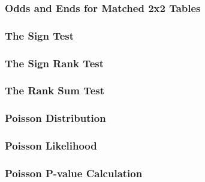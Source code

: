 \documentclass{homework}
\begin{document}
\subsubsection{Odds and Ends for Matched 2x2 Tables}

\subsubsection{The Sign Test}

\subsubsection{The Sign Rank Test}

\subsubsection{The Rank Sum Test}

\subsubsection{Poisson Distribution}

\subsubsection{Poisson Likelihood}

\subsubsection{Poisson P-value Calculation}
\end{document}
